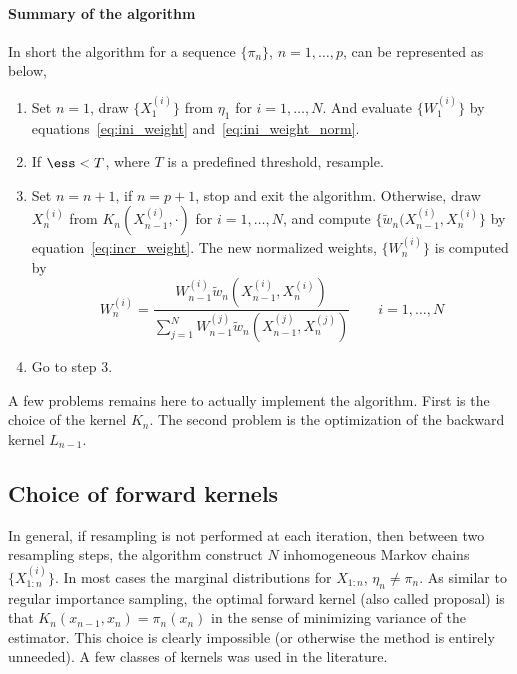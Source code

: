 \paragraph{Summary of the algorithm} In short the algorithm for a sequence
$\{\pi_n\}$, $n = 1,\dots,p$, can be represented as below,
\parencite{DelMoral2006}
\begin{enumerate}
  \item Set $n=1$, draw $\{X_1^{(i)}\}$ from $\eta_1$ for $i = 1,\dots,N$.
    And evaluate $\{W_1^{(i)}\}$ by equations~\eqref{eq:ini_weight}
    and~\eqref{eq:ini_weight_norm}.
  \item If $\text{\ess} < T$, where $T$ is a predefined threshold, resample.
  \item Set $n = n + 1$, if $n = p + 1$, stop and exit the algorithm.
    Otherwise, draw $X_n^{(i)}$ from $K_n(X_{n-1}^{(i)},\cdot)$ for $i =
    1,\dots,N$, and compute $\{\tilde{w}_n(X_{n-1}^{(i)}, X_n^{(i)}\}$ by
    equation~\eqref{eq:incr_weight}. The new normalized weights,
    $\{W_n^{(i)}\}$ is computed by
    \begin{equation}
      W_n^{(i)} = \frac{W_{n-1}^{(i)}\tilde{w}_n(X_{n-1}^{(i)},X_n^{(i)})}
      {\sum_{j=1}^NW_{n-1}^{(j)}\tilde{w}_n(X_{n-1}^{(j)},X_n^{(j)})}
      \qquad i = 1,\dots,N
    \end{equation}
  \item Go to step 3.
\end{enumerate}

A few problems remains here to actually implement the algorithm. First is the
choice of the kernel $K_n$. The second problem is the optimization of the
backward kernel $L_{n-1}$.

\subsection{Choice of forward kernels}
\label{sub:Choice of forward kernels}

In general, if resampling is not performed at each iteration, then between two
resampling steps, the \smc algorithm construct $N$ inhomogeneous Markov chains
$\{X_{1:n}^{(i)}\}$. In most cases the marginal distributions for $X_{1:n}$,
$\eta_n \ne \pi_n$. As similar to regular importance sampling, the optimal
forward kernel (also called proposal) is that $K_n(x_{n-1},x_n) = \pi_n(x_n)$
in the sense of minimizing variance of the estimator. This choice is clearly
impossible (or otherwise the \smc method is entirely unneeded). A few classes
of kernels was used in the literature.


